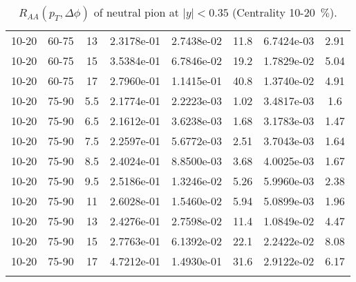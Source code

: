 \begin{longtable}{|cccccccc|}
10-20 & 60-75 & 13 & 2.3178e-01 & 2.7438e-02 & 11.8 & 6.7424e-03 & 2.91 \\ 
10-20 & 60-75 & 15 & 3.5384e-01 & 6.7846e-02 & 19.2 & 1.7829e-02 & 5.04 \\ 
10-20 & 60-75 & 17 & 2.7960e-01 & 1.1415e-01 & 40.8 & 1.3740e-02 & 4.91 \\ 
\hline
10-20 & 75-90 & 5.5 & 2.1774e-01 & 2.2223e-03 & 1.02 & 3.4817e-03 & 1.6 \\ 
10-20 & 75-90 & 6.5 & 2.1612e-01 & 3.6238e-03 & 1.68 & 3.1783e-03 & 1.47 \\ 
10-20 & 75-90 & 7.5 & 2.2597e-01 & 5.6772e-03 & 2.51 & 3.7043e-03 & 1.64 \\ 
10-20 & 75-90 & 8.5 & 2.4024e-01 & 8.8500e-03 & 3.68 & 4.0025e-03 & 1.67 \\ 
10-20 & 75-90 & 9.5 & 2.5186e-01 & 1.3246e-02 & 5.26 & 5.9960e-03 & 2.38 \\ 
10-20 & 75-90 & 11 & 2.6028e-01 & 1.5460e-02 & 5.94 & 5.0899e-03 & 1.96 \\ 
10-20 & 75-90 & 13 & 2.4276e-01 & 2.7598e-02 & 11.4 & 1.0849e-02 & 4.47 \\ 
10-20 & 75-90 & 15 & 2.7763e-01 & 6.1392e-02 & 22.1 & 2.2422e-02 & 8.08 \\ 
10-20 & 75-90 & 17 & 4.7212e-01 & 1.4930e-01 & 31.6 & 2.9122e-02 & 6.17 \\ 
\hline
\caption{$R_{AA}(p_{T},\Delta\phi)$ of neutral pion at $|y|<0.35$ (Centrality 10-20~$\%$).}
\end{longtable}
            
